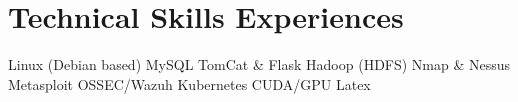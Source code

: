 \section{Technical Skills Experiences}\vspace{0.15cm}
Linux (Debian based)
MySQL
TomCat \& Flask
Hadoop (HDFS)
Nmap \& Nessus
Metasploit
OSSEC/Wazuh
Kubernetes
CUDA/GPU
Latex